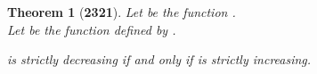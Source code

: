 \documentclass[preview]{standalone}
\newtheorem{theorem}{Theorem}
\begin{document}
\begin{theorem}[\textbf{2321}]
    Let \bm{$\gamma$} be the function .
    \\
    Let \bm{$\delta$} be the function  
    defined by . 
    \begin{center}
        \bm{$\gamma[\alpha]$} is strictly decreasing 
            if and only if 
        \bm{$\delta[\alpha]$} is strictly increasing.
    \end{center}
\end{theorem}
\end{document}
